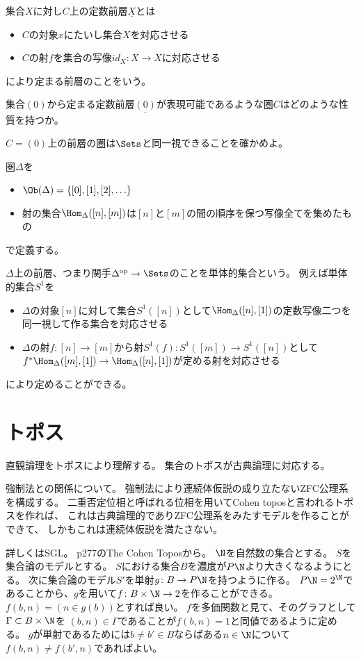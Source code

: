 \documentclass[uplatex]{jsarticle}
\begin{document}
集合$X$に対し$C$上の定数前層$\underline{X}$とは
\begin{itemize}
\item $C$の対象$x$にたいし集合$X$を対応させる
\item $C$の射$f$を集合の写像$id_X:X\to X$に対応させる
\end{itemize}
により定まる前層のことをいう。

\begin{prob}
集合$(0)$から定まる定数前層$\underline{(0)}$が表現可能であるような圏$C$はどのような性質を持つか。
\end{prob}

\begin{prob}
$C=(0)$上の前層の圏は$\Sets$と同一視できることを確かめよ。
\end{prob}


圏$\Delta$を
\begin{itemize}
\item $\Ob(\Delta)=\{[0], [1], [2], \ldots\}$
\item 射の集合$\Hom_\Delta([n],[m])$は$[n]$と$[m]$の間の順序を保つ写像全てを集めたもの
\end{itemize}
で定義する。

$\Delta$上の前層、つまり関手$\Delta^{\rm op}\to \Sets$のことを単体的集合という。
例えば単体的集合$S^1$を
\begin{itemize}
\item $\Delta$の対象$[n]$に対して集合$S^1([n])$として$\Hom_\Delta([n],[1])$の定数写像二つを同一視して作る集合を対応させる
\item $\Delta$の射$f:[n]\to [m]$から射$S^1(f):S^1([m])\to S^1([n])$として$f^*\Hom_\Delta([m],[1])\to\Hom_\Delta([n],[1])$が定める射を対応させる
\end{itemize}
により定めることができる。

\section{トポス}
直観論理をトポスにより理解する。
集合のトポスが古典論理に対応する。

強制法との関係について。
強制法により連続体仮説の成り立たないZFC公理系を構成する。
二重否定位相と呼ばれる位相を用いてCohen toposと言われるトポスを作れば、
これは古典論理的でありZFC公理系をみたすモデルを作ることができて、
しかもこれは連続体仮説を満たさない。

詳しくはSGL。
p277のThe Cohen Toposから。
$\N$を自然数の集合とする。
$S$を集合論のモデルとする。
$S$における集合$B$を濃度が$P\N$より大きくなるようにとる。
次に集合論のモデル$S'$を単射$g\colon B\to P\N$を持つように作る。
$P\N=2^\N$であることから、$g$を用いて$f\colon B\times\N\to 2$を作ることができる。
$f(b,n)=(n \in g(b))$とすれば良い。
$f$を多価関数と見て、そのグラフとして$\Gamma\subset B\times\N$を
$(b,n)\in\Gamma$であることが$f(b,n)=1$と同値であるように定める。
$g$が単射であるためには$b\neq b'\in B$ならばある$n\in\N$について$f(b,n)\neq f(b',n)$であればよい。
\end{document}
